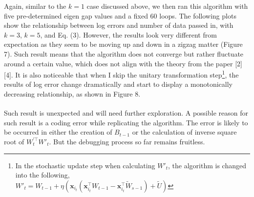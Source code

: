 \documentclass{article}
\begin{document}
Again, similar to the $k=1$ case discussed above, we then ran this algorithm with five pre-determined eigen gap values and a fixed 60 loops. The following plots show the relationship between log errors and number of data passed in, with $k = 3$, $k = 5$, and Eq. (3). However, the results look very different from expectation as they seem to be moving up and down in a zigzag matter (Figure 7). Such result means that the algorithm does not converge but rather fluctuate around a certain value, which does not align with the theory from the paper [2][4]. It is also noticeable that when I skip the unitary transformation step\footnote{In the stochastic update step when calculating $W'_t$, the algorithm is changed into the following, \\ $W'_t = W_{t-1}+\eta (\textbf{x}_{i_t}(\textbf{x}^\top_{i_t}W_{t-1}-\textbf{x}^\top_{i_t}\tilde{W}_{s-1}) + \tilde{U})$}, the results of log error change dramatically and start to display a monotonically decreasing relationship, as shown in Figure 8. \\ \\ 
Such result is unexpected and will need further exploration. A possible reason for such result is a coding error while replicating the algorithm. The error is likely to be occurred in either the creation of $B_{t-1}$ or the calculation of inverse square root of $W_t^{'\top}W'_t$. But the debugging process so far remains fruitless. 
\end{document}
